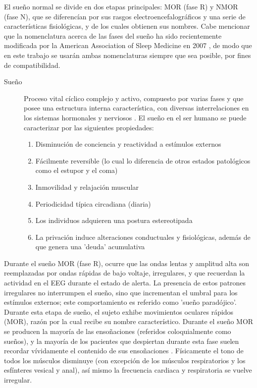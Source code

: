 \documentclass[12pt,a4paper]{mitthesis}
\begin{document}
El sue\~no normal se divide en dos etapas principales: MOR (fase R) y NMOR (fase N), que se 
diferenc\'ian por sus rasgos electroencefalogr\'aficos y una serie de caracter\'isticas 
fisiol\'ogicas, y de los cuales obtienen sus nombres.
Cabe mencionar que la nomenclatura acerca de las fases del sue\~no ha sido recientemente modificada 
por la American Association of Sleep Medicine en 2007 \cite{AASM07}, de modo que en este trabajo se 
usar\'an ambas nomenclaturas siempre que sea posible, por fines de compatibilidad.

\begin{description}
\item[Sue\~no] Proceso vital c\'iclico complejo y activo, compuesto por varias fases y que posee 
una estructura interna caracter\'istica, con diversas interrelaciones en los sistemas hormonales y 
nerviosos \cite{FernandezConde07}.
El sue\~no en el ser humano se puede caracterizar por las siguientes propiedades\cite{CarrilloMora}:
\begin{enumerate}
\item Disminuci\'on de conciencia y reactividad a est\'imulos externos
\item F\'acilmente reversible (lo cual lo diferencia de otros estados 
patol\'ogicos como el estupor y el coma)
\item Inmovilidad y relajaci\'on muscular
\item Periodicidad t\'ipica circadiana (diaria)
\item Los individuos adquieren una postura estereotipada
\item La privaci\'on induce alteraciones conductuales y 
fisiol\'ogicas, adem\'as de que genera una 'deuda' acumulativa
\end{enumerate}
\end{description}

Durante el sue\~no MOR (fase R), ocurre que las ondas lentas y amplitud alta son reemplazadas por 
ondas r\'apidas de bajo voltaje, irregulares, y que recuerdan la actividad en el EEG durante el 
estado de alerta.
La presencia de estos patrones irregulares no interrumpen el sue\~no, sino que incrementan el 
umbral para los est\'imulos externos; este comportamiento es referido como 'sue\~no parad\'ojico'.
Durante esta etapa de sue\~no, el sujeto exhibe movimientos oculares r\'apidos (MOR), raz\'on por 
la cual recibe su nombre caracter\'istico.
Durante el sue\~no MOR se producen la mayor\'ia de las enso\~naciones (referidos coloquialmente 
como sue\~nos), y la mayor\'ia de los pacientes que despiertan durante esta fase suelen recordar 
v\'ividamente el contenido de sus enso\~naciones \cite{Chokroverty09}.
F\'isicamente el tono de todos los m\'usculos disminuye (con excepción de los m\'usculos 
respiratorios y los esf\'interes vesical y anal), as\'i mismo la frecuencia cardiaca y respiratoria 
se vuelve irregular.
\end{document}
